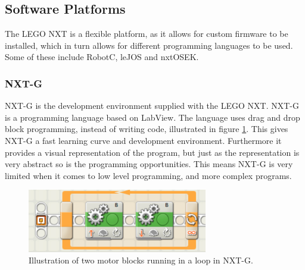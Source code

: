 \subsection{Software Platforms} \label{softwareplatforms}
The LEGO NXT is a flexible platform, as it allows for custom firmware to be installed, which in turn allows for different programming languages to be used.
Some of these include RobotC\cite{RobotC}, leJOS\cite{leJOS} and nxtOSEK\cite{nxtOSEK}.

\subsubsection{NXT-G}
NXT-G is the development environment supplied with the LEGO NXT. NXT-G is a programming language based on LabView\cite{LabView}. The language uses drag and drop block programming, instead of writing code, illustrated in figure \ref{NXT-G}. This gives NXT-G a fast learning curve and development environment. Furthermore it provides a visual representation of the program, but just as the representation is very abstract so is the programming opportunities. This means NXT-G is very limited when it comes to low level programming, and more complex programs.



\begin{figure}[H]
    \centering
    \includegraphics[width=0.7\textwidth]{Images/Software/Mindstorms/mindstorms_block.png}
    \caption{Illustration of two motor blocks running in a loop in NXT-G.}
    \label{NXT-G}
\end{figure}


